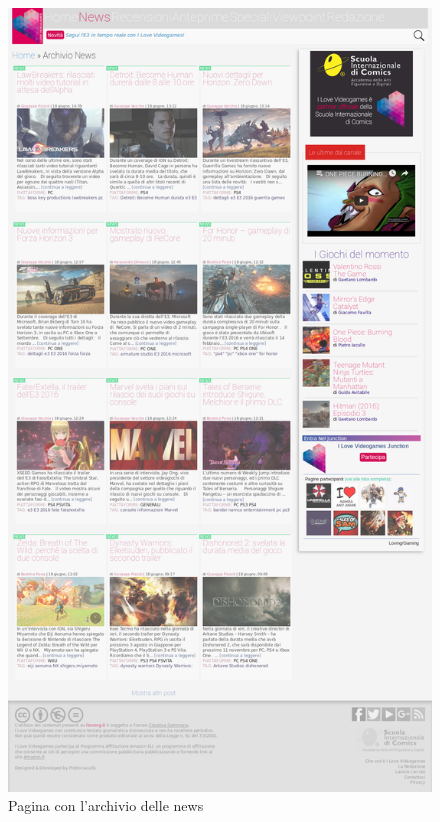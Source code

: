 \documentclass[../ProgettoTecWeb2.tex]{subfiles}
\begin{document}
	\begin{figure} [H]
			\centering
			\includegraphics[scale=0.24]{img/NewsCompleta}
			\caption{Pagina con l'archivio delle news}
	\end{figure}
\end{document}
